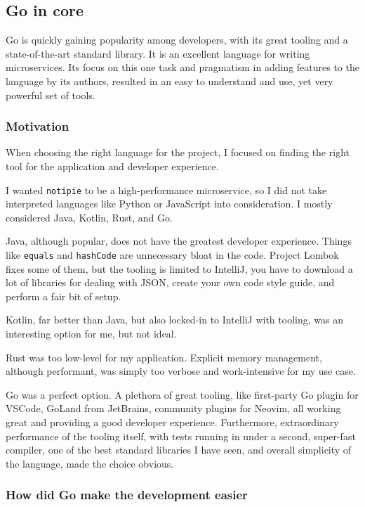 \subsection{Go in core}\label{sec:go-in-core}

Go is quickly gaining popularity among developers,
with its great tooling
and a state-of-the-art standard library.
It is an excellent language for writing microservices.
Its focus on this one task
and pragmatism in adding features to the language by its authors,
resulted in an easy to understand and use,
yet very powerful set of tools.

\subsubsection{Motivation}\label{sec:motivation}

When choosing the right language for the project,
I focused on finding the right tool
for the application and developer experience.

I wanted \texttt{notipie} to be a high-performance microservice,
so I did not take interpreted languages
like Python or JavaScript into consideration.
I mostly considered Java, Kotlin, Rust, and Go.

Java, although popular, does not have the greatest developer experience.
Things like \texttt{equals} and \texttt{hashCode}
are unnecessary bloat in the code.
Project Lombok~\cite{zwitserloot_project_2022} fixes some of them,
but the tooling is limited to IntelliJ,
you have to download a lot of libraries for dealing with JSON,
create your own code style guide,
and perform a fair bit of setup.

Kotlin, far better than Java,
but also locked-in to IntelliJ with tooling,
was an interesting option for me, but not ideal.

Rust was too low-level for my application.
Explicit memory management, although performant,
was simply too verbose and work-intensive for my use case.

Go was a perfect option.
A plethora of great tooling,
like first-party Go plugin for VSCode, GoLand from JetBrains,
community plugins for Neovim,
all working great and providing a good developer experience.
Furthermore, extraordinary performance of the tooling itself,
with tests running in under a second, super-fast compiler,
one of the best standard libraries I have seen,
and overall simplicity of the language, made the choice obvious.

\subsubsection{How did Go make the development easier}\label{sec:how-did-go-make-the-development-easier}

